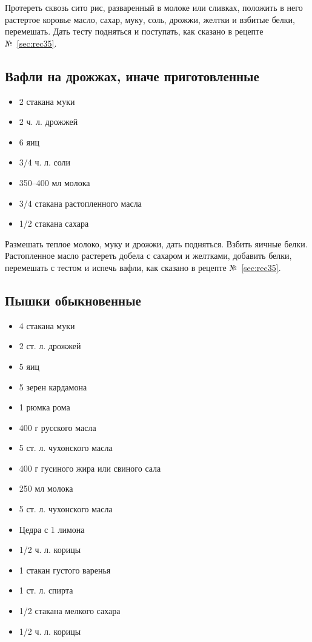 Протереть сквозь сито рис, разваренный в молоке или сливках, положить в него растертое коровье масло, сахар, муку, соль, дрожжи, желтки и взбитые белки, перемешать. Дать тесту подняться и поступать, как сказано в рецепте №~\ref{sec:rec35}.

\subsection{Вафли на дрожжах, иначе приготовленные}

\begin{itemize}
	\item 2 стакана муки
    \item 2 ч. л. дрожжей
    \item 6 яиц
    \item 3/4 ч. л. соли
    \item 350–400 мл молока
    \item 3/4 стакана растопленного масла
    \item 1/2 стакана сахара
\end{itemize}

Размешать теплое молоко, муку и дрожжи, дать подняться. Взбить яичные белки. Растопленное масло растереть добела с сахаром и желтками, добавить белки, перемешать с тестом и испечь вафли, как сказано в рецепте №~\ref{sec:rec35}.

\subsection{Пышки обыкновенные}

\begin{itemize}
	\item 4 стакана муки 
    \item 2 ст. л. дрожжей 
    \item 5 яиц 
    \item 5 зерен кардамона 
    \item 1 рюмка рома
    \item 400 г русского масла 
    \item 5 ст. л. чухонского масла 
    \item 400 г гусиного жира или свиного сала
    \item 250 мл молока
    \item 5 ст. л. чухонского масла
    \item Цедра с 1 лимона
    \item 1/2 ч. л. корицы
    \item 1 стакан густого варенья 
    \item 1 ст. л. спирта
    \item 1/2 стакана мелкого сахара 
    \item 1/2 ч. л. корицы
\end{itemize}

